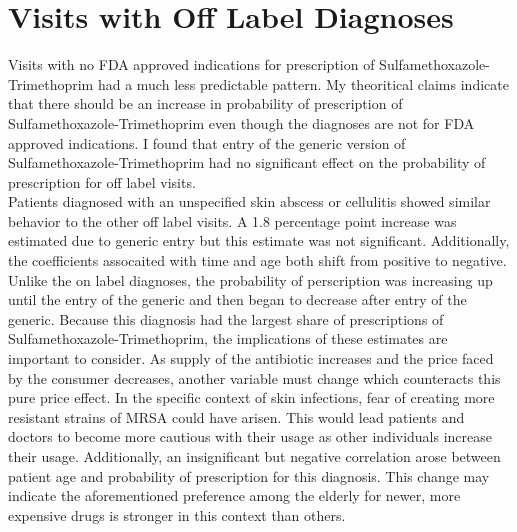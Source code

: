 \section{Visits with Off Label Diagnoses}
\indent Visits with no FDA approved indications for prescription of Sulfamethoxazole-Trimethoprim had a much less predictable pattern. My theoritical claims indicate that there should be an increase in probability of prescription of Sulfamethoxazole-Trimethoprim even though the diagnoses are not for FDA approved indications. I found that entry of the generic version of Sulfamethoxazole-Trimethoprim had no significant effect on the probability of prescription for off label visits.\\
\indent Patients diagnosed with an unspecified skin abscess or cellulitis showed similar behavior to the other off label visits. A 1.8 percentage point increase was estimated due to generic entry but this estimate was not significant. Additionally, the coefficients assocaited with time and age both shift from positive to negative. Unlike the on label diagnoses, the probability of perscription was increasing up until the entry of the generic and then began to decrease after entry of the generic. Because this diagnosis had the largest share of prescriptions of Sulfamethoxazole-Trimethoprim, the implications of these estimates are important to consider. As supply of the antibiotic increases and the price faced by the consumer decreases, another variable must change which counteracts this pure price effect. In the specific context of skin infections, fear of creating more resistant strains of MRSA could have arisen. This would lead patients and doctors to become more cautious with their usage as other individuals increase their usage. Additionally, an insignificant but negative correlation arose between patient age and probability of prescription for this diagnosis. This change may indicate the aforementioned preference among the elderly for newer, more expensive drugs \cite{kianmehr_system_2020} is stronger in this context than others.